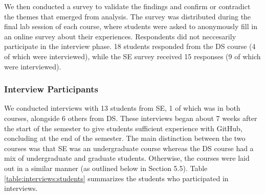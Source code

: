 
We then conducted a survey to validate the findings and confirm or contradict the themes that emerged from analysis. The survey was distributed during the final lab session of each course, where students were asked to anonymously fill in an online survey about their experiences. Respondents did not neccesarily participate in the interview phase. 18 students responded from the DS course (4 of which were interviewed), while the SE survey received 15 responses (9 of which were interviewed).

\subsubsection{Interview Participants}
We conducted interviews with 13 students from SE, 1 of which was in both courses, alongside 6 others from DS. These interviews began about 7 weeks after the start of the semester to give students sufficient experience with GitHub, concluding at the end of the semester. The main distinction between the two courses was that SE was an undergraduate course whereas the DS course had a mix of undergraduate and graduate students. Otherwise, the courses were laid out in a similar manner (as outlined below in Section 5.5). Table \ref{table:interviews:students} summarizes the students who participated in interviews.


